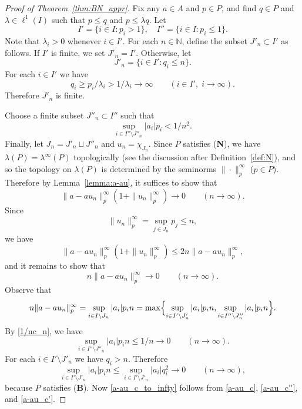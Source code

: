 \documentclass[12pt,reqno]{amsart}
\theoremstyle{definition}
\begin{document}
\begin{proof}[Proof of Theorem~\ref{thm:BN_appr}]
Fix any $a\in A$ and $p\in P$, and find $q\in P$ and $\lambda\in\ell^1(I)$ such that
$p\le q$ and $p\le\lambda q$. Let
\[
I'=\{ i\in I : p_i>1\},\quad I''=\{ i\in I : p_i\le 1\}.
\]
Note that $\lambda_i>0$ whenever $i\in I'$.
For each $n\in{\mathbb N}$, define the subset $J'_n\subset I'$ as follows.
If $I'$ is finite, we set $J'_n=I'$. Otherwise, let
\[
J'_n=\{ i\in I' : q_i\le n\}.
\]
For each $i\in I'$ we have
\[
q_i\ge p_i/\lambda_i>1/\lambda_i\to\infty\qquad (i\in I',\; i\to\infty).
\]
Therefore $J'_n$ is finite.

Choose a finite subset $J''_n\subset I''$ such that
\begin{equation}
\label{1/nc_n}
\sup_{i\in I''\setminus J''_n} |a_i| p_i<1/n^2.
\end{equation}
Finally, let $J_n=J'_n\sqcup J''_n$ and $u_n=\chi_{J_n}$.
Since $P$ satisfies ({\textbf{N}}), we have $\lambda(P)=\lambda^\infty(P)$ topologically
(see the discussion after Definition~\ref{def:N}),
and so the topology on $\lambda(P)$ is determined by the seminorms
$\|\cdot\|_p^\infty$ ($p\in P$). Therefore
by Lemma~\ref{lemma:a-au}, it suffices to show that
\[
\| a-au_n\|_p^\infty (1+\| u_n\|_p^\infty)\to 0 \qquad (n\to\infty).
\]
Since
\[
\| u_n\|^\infty_p=\sup_{j\in J_n} p_j \le n,
\]
we have
\[
\| a-au_n\|_p^\infty (1+\| u_n\|_p^\infty)
\le 2n\| a-au_n\|_p^\infty,
\]
and it remains to show that
\begin{equation}
\label{a-au_c_to_infty}
n\| a-au_n\|_p^\infty \to 0 \qquad (n\to\infty).
\end{equation}
Observe that
\begin{equation}
\label{a-au_c}
n\| a-au_n\|_p^\infty
=\sup_{i\in I\setminus J_n} |a_i|p_i n
=\max\Bigl\{ \sup_{i\in I'\setminus J'_n} |a_i|p_i n,
\sup_{i\in I''\setminus J''_n} |a_i|p_i n\Bigr\}.
\end{equation}
By \eqref{1/nc_n}, we have
\begin{equation}
\label{a-au_c''}
\sup_{i\in I''\setminus J''_n} |a_i|p_i n\le 1/n\to 0\qquad (n\to\infty).
\end{equation}
For each $i\in I'\setminus J'_n$ we have $q_i>n$. Therefore
\begin{equation}
\label{a-au_c'}
\sup_{i\in I'\setminus J'_n} |a_i|p_i n
\le \sup_{i\in I'\setminus J'_n} |a_i|q_i^2\to 0 \qquad (n\to\infty),
\end{equation}
because $P$ satisfies ({\textbf{B}}). Now  \eqref{a-au_c_to_infty} follows
from \eqref{a-au_c}, \eqref{a-au_c''}, and \eqref{a-au_c'}.
\end{proof}
\end{document}
